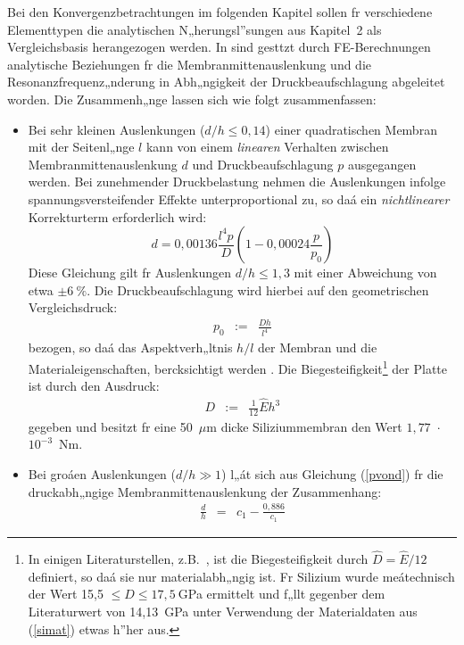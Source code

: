 Bei den Konvergenzbetrachtungen im folgenden Kapitel sollen fr
verschiedene Elementtypen die analytischen N„herungsl”sungen
aus Kapitel~2 als Vergleichsbasis herangezogen werden.
In \cite{Fab92a, Sch92} sind gesttzt durch FE-Berechnungen analytische
Beziehungen fr die Membranmittenauslenkung und die
Resonanzfrequenz„nderung in Abh„ngigkeit der Druckbeaufschlagung
abgeleitet worden. Die Zusammenh„nge lassen sich wie folgt
zusammenfassen:
%
\begin{itemize}
\item Bei sehr kleinen Auslenkungen ($d/h \leq 0,14$) einer quadratischen
Membran mit der Seitenl„nge $l$ kann von einem {\em linearen} Verhalten
zwischen
Membranmittenauslenkung $d$ und Druckbeaufschlagung $p$ ausgegangen werden.
Bei zunehmender Druckbelastung nehmen die Auslenkungen infolge
spannungsversteifender Effekte unterproportional zu, so daá ein
{\em nichtlinearer} Korrekturterm erforderlich wird:
\begin{equation}
\label{nonlin1}
 d = 0,00136 \frac{l^{4}p}{D} \left(1 - 0,00024 \frac{p}{p_{0}} \right)
\end{equation}
Diese Gleichung gilt fr Auslenkungen $d/h \leq 1,3$ mit einer Abweichung
von etwa $\pm 6~\%$. Die Druckbeaufschlagung wird hierbei auf den
\glqq geometrischen Vergleichsdruck\grqq:
\begin{eqnarray}
\label{p0D}
 p_{0}   & := & \frac{Dh}{l^{4}} \nonumber
\end{eqnarray}
bezogen, so daá das Aspektverh„ltnis $h/l$ der Membran und die
Materialeigenschaften, bercksichtigt werden \cite{Pfe89}. Die
Biegesteifigkeit\footnote{In einigen Literaturstellen, z.B.\ \cite{Pon91},
ist
die Biegesteifigkeit durch $\hat D = \hat E/12$ definiert, so daá sie nur
materialabh„ngig ist. Fr Silizium wurde meátechnisch der Wert
15,5 $\le \hat D \le 17,5~$GPa ermittelt und f„llt gegenber dem
Literaturwert von 14,13~GPa unter Verwendung der Materialdaten aus
(\ref{simat}) etwas h”her aus.} der Platte ist durch
den Ausdruck:
\begin{eqnarray}
\label{biegesteif}
 D & := & \frac{1}{12} \hat E h^{3}
\end{eqnarray}
gegeben und besitzt fr eine 50~$\mu$m dicke Siliziummembran
den Wert $1,77$~$\cdot$~$10^{-3}$~Nm.
%
\item Bei groáen Auslenkungen ($d/h \gg 1$) l„át sich aus Gleichung
(\ref{pvond}) fr die druckabh„ngige Membranmittenauslenkung der
Zusammenhang:
\begin{eqnarray}
\label{memausl}
 \frac{d}{h} & = & c_{1} - \frac{0,886}{c_{1}}

\end{eqnarray}
\end{itemize}
